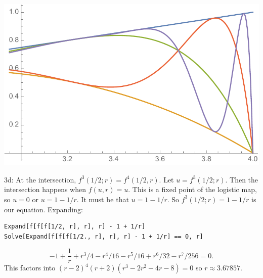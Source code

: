 \documentclass[12pt,letterpaper,noanswers]{exam}
\begin{document}
\includegraphics{img/17-04-12p1.pdf}

3d: At the intersection, $f^3(1/2;r) = f^4(1/2,r)$.  Let $u = f^3(1/2;r)$.  Then the intersection happens when $f(u,r) = u$.  This is a fixed point of the logistic map, so $u = 0$ or $u = 1-1/r$.  It must be that $u = 1-1/r$.  So $f^3(1/2;r) = 1-1/r$ is our equation.  Expanding:
\begin{verbatim}
Expand[f[f[f[1/2, r], r], r] - 1 + 1/r]
Solve[Expand[f[f[f[1/2., r], r], r] - 1 + 1/r] == 0, r]
\end{verbatim}
\[-1 + \frac{1}{r} + r^3/4-r^4/16-r^5/16+r^6/32-r^7/256=0.\]  This factors into $(r-2)^4(r+2)(r^3-2r^2-4r-8)=0$ so $r\approx 3.67857$.
\end{document}
